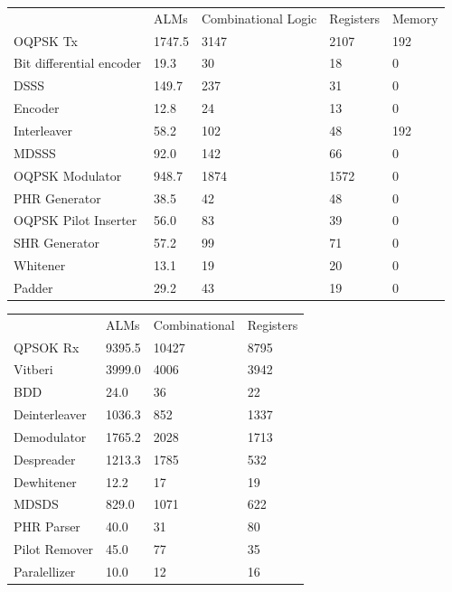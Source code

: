  
\begin{table}[]
\begin{tabular}{lllll}
                         & ALMs   & Combinational Logic & Registers & Memory \\
OQPSK Tx                 & 1747.5 & 3147                & 2107      & 192    \\
Bit differential encoder & 19.3   & 30                  & 18        & 0      \\
DSSS                     & 149.7  & 237                 & 31        & 0      \\
Encoder                  & 12.8   & 24                  & 13        & 0      \\
Interleaver              & 58.2   & 102                 & 48        & 192    \\
MDSSS                    & 92.0   & 142                 & 66        & 0      \\
OQPSK Modulator          & 948.7  & 1874                & 1572      & 0      \\
PHR Generator            & 38.5   & 42                  & 48        & 0      \\
OQPSK Pilot Inserter     & 56.0   & 83                  & 39        & 0      \\
SHR Generator            & 57.2   & 99                  & 71        & 0      \\
Whitener                 & 13.1   & 19                  & 20        & 0      \\
Padder                   & 29.2   & 43                  & 19        & 0     
\end{tabular}
\end{table}
 

\begin{table}[]
\begin{tabular}{llll}
                        & ALMs   & Combinational & Registers \\
QPSOK Rx           & 9395.5 & 10427         & 8795      \\
Vitberi                 & 3999.0 & 4006          & 3942      \\
BDD						 & 24.0   & 36            & 22        \\
Deinterleaver           & 1036.3 & 852           & 1337      \\
Demodulator             & 1765.2 & 2028          & 1713      \\
Despreader              & 1213.3 & 1785          & 532       \\
Dewhitener              & 12.2   & 17            & 19        \\
MDSDS                   & 829.0  & 1071          & 622       \\
PHR Parser              & 40.0   & 31            & 80        \\
Pilot Remover           & 45.0   & 77            & 35        \\
Paralellizer            & 10.0   & 12            & 16       
\end{tabular}
\end{table}

